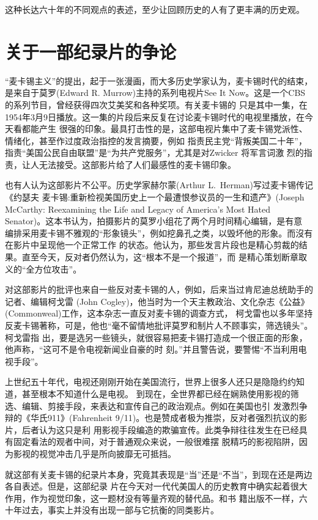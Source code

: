 \documentclass[10pt]{article}
\begin{document}
{这种长达六十年的不同观点的表述，至少让回顾历史的人有了更丰满的历史观。

\pagebreak
\section{关于一部纪录片的争论}

``麦卡锡主义''的提出，起于一张漫画，而大多历史学家认为，麦卡锡时代的结束，是来自于莫罗(Edward R.
Murrow)主持的系列电视片See It Now。这是一个CBS的系列节目，曾经获得四次艾美奖和各种奖项。有关麦卡锡的
只是其中一集，在1954年3月9日播放。这一集的片段后来反复在讨论麦卡锡时代的电视里播放，在今天看都能产生
很强的印象。最具打击性的是，这部电视片集中了麦卡锡党派性、情绪化，甚至作过度政治指控的发言摘要，例如
指责民主党``背叛美国二十年''，指责``美国公民自由联盟''是``为共产党服务''，尤其是对Zwicker 将军言词激
烈的指责，让人无法接受。这部影片给了人们最感性的麦卡锡印象。

也有人认为这部影片不公平。历史学家赫尔蒙(Arthur L.~Herman)写过麦卡锡传记《约瑟夫\textperiodcentered
麦卡锡:重新检视美国历史上一个最遭恨参议员的一生和遗产》(Joseph McCarthy: Reexamining the Life and
Legacy of America's Most Hated Senator)。这本书认为，拍摄影片的莫罗小组花了两个月时间精心编辑，是有意
编排采用麦卡锡不雅观的``形象镜头''，例如挖鼻孔之类，以毁坏他的形象。而沒有在影片中呈现他一个正常工作
的状态。他认为，那些发言片段也是精心剪裁的结果。直至今天，反对者仍然认为，这``根本不是一个报道''，而
是精心策划断章取义的``全方位攻击''。

对这部影片的批评也来自一些反对麦卡锡的人，例如，后来当过肯尼迪总统助手的记者、编辑柯戈雷 (John
Cogley)，他当时为一个天主教政治、文化杂志《公益》(Commonweal)工作，这本杂志一直反对麦卡锡的调查方式，
柯戈雷也以多年坚持反麦卡锡著称，可是，他也``毫不留情地批评莫罗和制片人不顾事实，筛选镜头''。柯戈雷指
出，要是选另一些镜头，就很容易把麦卡锡打造成一个很正面的形象，他声称，``这可不是令电视新闻业自豪的时
刻。''并且警告说，要警惕``不当利用电视手段''。

上世纪五十年代，电视还刚刚开始在美国流行，世界上很多人还只是隐隐约约知道，甚至根本不知道什么是电视。
到现在，全世界都已经在娴熟使用影视的筛选、编辑、剪接手段，来表达和宣传自己的政治观点。例如在美国也引
发激烈争辩的《华氏911》(Fahrenheit 9/11)。也是赞成者极为推崇，反对者强烈抗议的影片，后者认为这只是利
用影视手段编造的欺骗宣传。此类争辩往往发生在已经具有固定看法的观者中间，对于普通观众来说，一般很难摆
脱精巧的影视陷阱，因为影视的视觉冲击几乎是所向披靡无可抵挡。

就这部有关麦卡锡的纪录片本身，究竟其表现是``当''还是``不当''，到现在还是两边各自表述。但是，这部纪录
片在今天对一代代美国人的历史教育中确实起着很大作用，作为视觉印象，这一题材没有等量齐观的替代品。和书
籍出版不一样，六十年过去，事实上并没有出现一部与它抗衡的同类影片。

}
\end{document}

